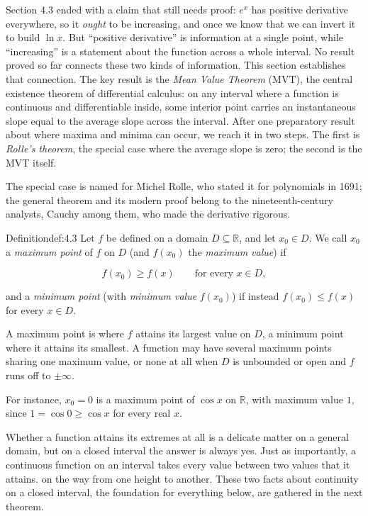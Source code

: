 \documentclass[a4paper,12pt,oneside]{memoir}
\begin{document}
Section 4.3 ended with a claim that still needs proof: \(e^{x}\) has positive derivative everywhere, so it \emph{ought} to be increasing, and once we know that we can invert it to build \(\ln x\). But “positive derivative” is information at a single point, while “increasing” is a statement about the function across a whole interval. No result proved so far connects these two kinds of information. This section establishes that connection. The key result is the \emph{Mean Value Theorem} (MVT), the central existence theorem of differential calculus: on any interval where a function is continuous and differentiable inside, some interior point carries an instantaneous slope equal to the average slope across the interval. After one preparatory result about where maxima and minima can occur, we reach it in two steps. The first is \emph{Rolle’s theorem}, the special case where the average slope is zero; the second is the MVT itself.

The special case is named for Michel Rolle, who stated it for polynomials in 1691; the general theorem and its modern proof belong to the nineteenth-century analysts, Cauchy among them, who made the derivative rigorous.

\begin{envdefinition}{Definition}{def:4.3}{}
Let \(f\) be defined on a domain \(D \subseteq \mathbb{R}\), and let \(x_{0} \in D\). We call \(x_{0}\) a \emph{maximum point} of \(f\) on \(D\) (and \(f(x_{0})\) the \emph{maximum value}) if

\[ f(x_{0}) \ge f(x) \qquad \text{for every } x \in D, \]

and a \emph{minimum point} (with \emph{minimum value} \(f(x_{0})\)) if instead \(f(x_{0}) \le f(x)\) for every \(x \in D\).

\begin{informal}
A maximum point is where \(f\) attains its largest value on \(D\), a minimum point where it attains its smallest. A function may have several maximum points sharing one maximum value, or none at all when \(D\) is unbounded or open and \(f\) runs off to \(\pm\infty\).
\end{informal}
\end{envdefinition}
For instance, \(x_{0} = 0\) is a maximum point of \(\cos x\) on \(\mathbb{R}\), with maximum value \(1\), since \(1 = \cos 0 \ge \cos x\) for every real \(x\).

Whether a function attains its extremes at all is a delicate matter on a general domain, but on a closed interval the answer is always yes. Just as importantly, a continuous function on an interval takes every value between two values that it attains. on the way from one height to another. These two facts about continuity on a closed interval, the foundation for everything below, are gathered in the next theorem.
\end{document}
